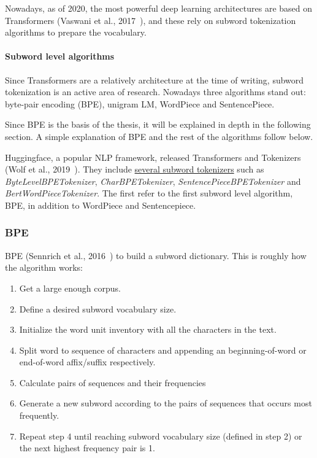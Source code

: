 Nowadays, as of 2020, the most powerful deep learning architectures are based on Transformers (Vaswani et al., 2017~\cite{vaswani2017attention}), and these rely on subword tokenization algorithms to prepare the vocabulary.

\paragraph{Subword level algorithms}

Since Transformers are a relatively architecture at the time of writing, subword tokenization is an active area of research. Nowadays three algorithms stand out: byte-pair encoding (BPE), unigram LM, WordPiece and SentencePiece.

Since BPE is the basis of the thesis, it will be explained in depth in the following section. A simple explanation of BPE and the rest of the algorithms follow below.

Huggingface, a popular NLP framework, released Transformers and Tokenizers (Wolf et al., 2019~\cite{wolf2019huggingfaces}). They include \href{https://github.com/huggingface/tokenizers/tree/74d812d40180032d2dbb6ca59e2e10f0257ef46b/bindings/python/tokenizers/implementations}{several subword tokenizers} such as \emph{ByteLevelBPETokenizer}, \emph{CharBPETokenizer}, \emph{SentencePieceBPETokenizer} and \emph{BertWordPieceTokenizer}. The first refer to the first subword level algorithm, BPE, in addition to WordPiece and Sentencepiece.

\subsubsection{BPE}\label{subsubsec:bpe}

BPE (Sennrich et al., 2016~\cite{sennrich2015neural}) to build a subword dictionary. This is roughly how the algorithm works:

\begin{enumerate}
    \item Get a large enough corpus.
    \item Define a desired subword vocabulary size.
    \item Initialize the word unit inventory with all the characters in the text.
    \item Split word to sequence of characters and appending an beginning-of-word or end-of-word affix/suffix respectively.
    \item Calculate pairs of sequences and their frequencies
    \item Generate a new subword according to the pairs of sequences that occurs most frequently.
    \item Repeat step 4 until reaching subword vocabulary size (defined in step 2) or the next highest frequency pair is 1.
\end{enumerate}

